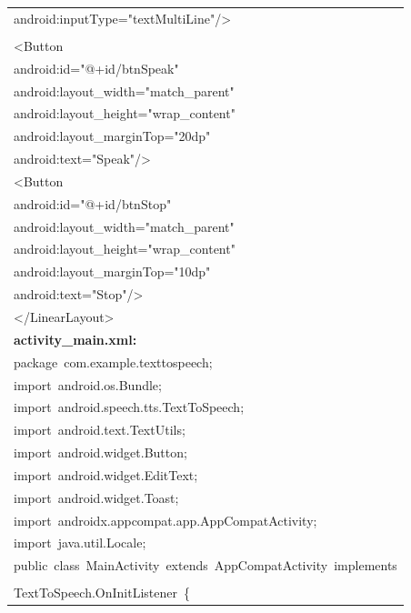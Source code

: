 \documentclass[a4paper,12pt]{article}
\begin{document}
\begin{longtable}{|p{}|}
{\ttfamily\small android:inputType="textMultiLine"/\textgreater{}} \\
\strut \\
{\ttfamily\small \textless{}Button} \\
{\ttfamily\small android:id="@+id/btnSpeak"} \\
{\ttfamily\small android:layout\_width="match\_parent"} \\
{\ttfamily\small android:layout\_height="wrap\_content"} \\
{\ttfamily\small android:layout\_marginTop="20dp"} \\
{\ttfamily\small android:text="Speak"/\textgreater{}} \\
{\ttfamily\small \textless{}Button} \\
{\ttfamily\small android:id="@+id/btnStop"} \\
{\ttfamily\small android:layout\_width="match\_parent"} \\
{\ttfamily\small android:layout\_height="wrap\_content"} \\
{\ttfamily\small android:layout\_marginTop="10dp"} \\
{\ttfamily\small android:text="Stop"/\textgreater{}} \\
{\ttfamily\small \textless{}/LinearLayout\textgreater{}} \\
\hline
\rule{0pt}{13pt}\textbf{activity\_main.xml:} \\
\hline
{\ttfamily\small package\ com.example.texttospeech;} \\
{\ttfamily\small import\ android.os.Bundle;} \\
{\ttfamily\small import\ android.speech.tts.TextToSpeech;} \\
{\ttfamily\small import\ android.text.TextUtils;} \\
{\ttfamily\small import\ android.widget.Button;} \\
{\ttfamily\small import\ android.widget.EditText;} \\
{\ttfamily\small import\ android.widget.Toast;} \\
{\ttfamily\small import\ androidx.appcompat.app.AppCompatActivity;} \\
{\ttfamily\small import\ java.util.Locale;} \\
{\ttfamily\small public\ class\ MainActivity\ extends\ AppCompatActivity\ implements} \\
\strut \\
{\ttfamily\small TextToSpeech.OnInitListener\ \{} \\

\end{longtable}
\end{document}
